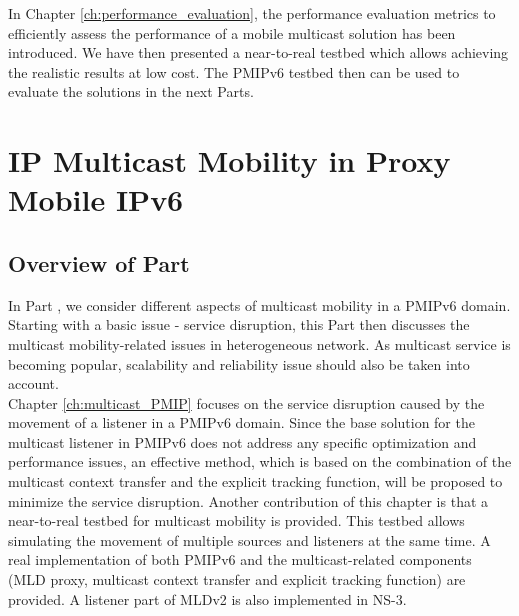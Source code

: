 \documentclass[a4paper,10pt,twoside]{ThesisStyle}
\begin{document}
In Chapter \ref{ch:performance_evaluation}, the performance evaluation metrics to efficiently assess the performance of a  mobile multicast solution has been introduced. We have then presented a near-to-real testbed which allows achieving the realistic results at low cost. The PMIPv6 testbed then can be used to evaluate the solutions in the next Parts. 

\part{IP Multicast Mobility in Proxy Mobile IPv6}
\label{pa:part2}
\chapter*{Overview of Part \ref{pa:part2}}

In Part \ref{pa:part2}, we consider different aspects of multicast mobility in a PMIPv6 domain. Starting with a basic issue - service disruption, this Part then discusses the multicast mobility-related issues in heterogeneous network. As multicast service is becoming popular, scalability and reliability issue should also be taken into account.\\

Chapter \ref{ch:multicast_PMIP} focuses on the service disruption caused by the movement of a listener in a PMIPv6 domain. Since the base solution for the multicast listener in PMIPv6 does not address any specific optimization and performance issues, an effective method, which is based on the combination of the multicast context transfer and the explicit tracking function, will be proposed to minimize the service disruption. Another contribution of this chapter is that a near-to-real testbed for multicast mobility is provided. This testbed allows simulating the movement of multiple sources and listeners at the same time. A real implementation of both PMIPv6 and the multicast-related components (MLD proxy, multicast context transfer and explicit tracking function) are provided. A listener part of MLDv2 is also implemented in NS-3.  \\
 
\end{document}
